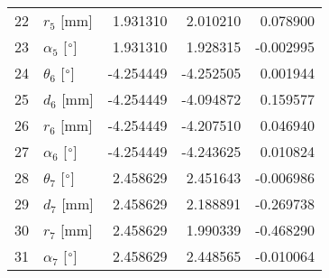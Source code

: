 \documentclass{standalone}%
\begin{document}
\begin{tabular}{llrrr}
22 &              $r_{5}$ [mm] &  1.931310 &   2.010210 &   0.078900 \\
23 &  $\alpha_{5}$ [$\degree$] &  1.931310 &   1.928315 &  -0.002995 \\
24 &  $\theta_{6}$ [$\degree$] & -4.254449 &  -4.252505 &   0.001944 \\
25 &              $d_{6}$ [mm] & -4.254449 &  -4.094872 &   0.159577 \\
26 &              $r_{6}$ [mm] & -4.254449 &  -4.207510 &   0.046940 \\
27 &  $\alpha_{6}$ [$\degree$] & -4.254449 &  -4.243625 &   0.010824 \\
28 &  $\theta_{7}$ [$\degree$] &  2.458629 &   2.451643 &  -0.006986 \\
29 &              $d_{7}$ [mm] &  2.458629 &   2.188891 &  -0.269738 \\
30 &              $r_{7}$ [mm] &  2.458629 &   1.990339 &  -0.468290 \\
31 &  $\alpha_{7}$ [$\degree$] &  2.458629 &   2.448565 &  -0.010064 \\
\bottomrule
\end{tabular}
%
\end{document}
